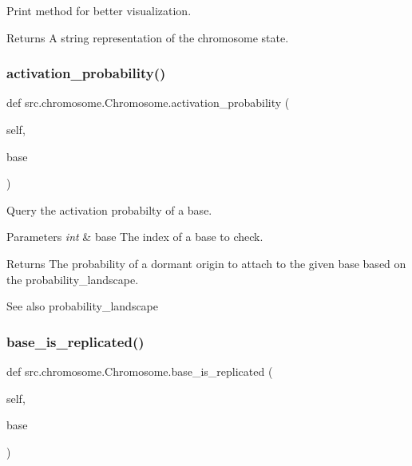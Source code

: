 Print method for better visualization. 

\begin{DoxyReturn}{Returns}
A string representation of the chromosome state. 
\end{DoxyReturn}
\mbox{\label{classsrc_1_1chromosome_1_1Chromosome_a8e82cfd0fb5a5ed11da3792fa759a72d}} 
\subsubsection{\texorpdfstring{activation\+\_\+probability()}{activation\_probability()}}
{\footnotesize\ttfamily def src.\+chromosome.\+Chromosome.\+activation\+\_\+probability (\begin{DoxyParamCaption}\item[{}]{self,  }\item[{}]{base }\end{DoxyParamCaption})}



Query the activation probabilty of a base. 


\begin{DoxyParams}{Parameters}
{\em int} & base The index of a base to check. \\
\hline
\end{DoxyParams}
\begin{DoxyReturn}{Returns}
The probability of a dormant origin to attach to the given base based on the probability\+\_\+landscape. 
\end{DoxyReturn}
\begin{DoxySeeAlso}{See also}
probability\+\_\+landscape 
\end{DoxySeeAlso}
\mbox{\label{classsrc_1_1chromosome_1_1Chromosome_a3f37683e2a0d2f50341c3d97f8344c73}} 
\subsubsection{\texorpdfstring{base\+\_\+is\+\_\+replicated()}{base\_is\_replicated()}}
{\footnotesize\ttfamily def src.\+chromosome.\+Chromosome.\+base\+\_\+is\+\_\+replicated (\begin{DoxyParamCaption}\item[{}]{self,  }\item[{}]{base }\end{DoxyParamCaption})}


